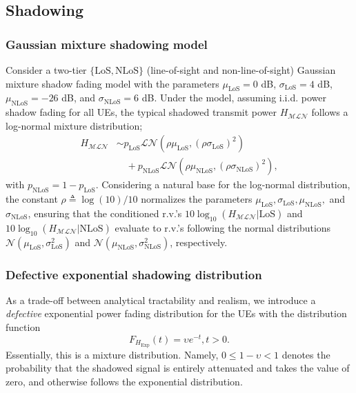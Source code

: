 \documentclass[lettersize,journal]{IEEEtran}
\begin{document}
\subsection{Shadowing}

\subsubsection{Gaussian mixture shadowing model}
\label{sec:guassianmixture}

Consider a two-tier $\{\text{LoS},\text{NLoS}\}$ (line-of-sight and non-line-of-sight) Gaussian mixture shadow fading model with the parameters $\mu_{\text{LoS}} = 0$ dB, $\sigma_{\text{LoS}} = 4$ dB, $\mu_{\text{NLoS}} = -26$ dB, and $\sigma_{\text{NLoS}} = 6$ dB. Under the model, assuming i.i.d. power shadow fading for all UEs, the typical shadowed transmit power $H_{\mathcal{M}\mathcal{L}\mathcal{N}}$ follows a log-normal mixture distribution;
\begin{align}
  \label{eq:tier2lognormal}
  H_{\mathcal{M}\mathcal{L}\mathcal{N}} &\sim p_{\text{LoS}} \mathcal{L}\mathcal{N}(\rho \mu_{\text{LoS}}, (\rho \sigma_{\text{LoS}})^2) \nonumber \\
  &\quad + p_{\text{NLoS}} \mathcal{L}\mathcal{N}(\rho \mu_{\text{NLoS}}, (\rho \sigma_{\text{NLoS}})^2),
\end{align}
with $p_{\text{NLoS}}= 1 - p_{\text{LoS}}$. Considering a natural base for the log-normal distribution, the constant $\rho \triangleq \log(10)/10$ normalizes the parameters $\mu_{\text{LoS}}, \sigma_{\text{LoS}}, \mu_{\text{NLoS}},$ and $\sigma_{\text{NLoS}}$, ensuring that the conditioned r.v.'s $10 \log_{10}(H_{\mathcal{MLN}}|\text{LoS})$ and $10 \log_{10}(H_{\mathcal{MLN}}|\text{NLoS})$ evaluate to r.v.'s following the normal distributions $\mathcal{N}(\mu_{\text{LoS}}, \sigma_{\text{LoS}}^2)$ and $\mathcal{N}(\mu_{\text{NLoS}}, \sigma_{\text{NLoS}}^2)$, respectively.



\subsubsection{Defective exponential shadowing distribution}
As a trade-off between analytical tractability and realism, we introduce a \textit{defective} exponential power fading distribution for the UEs with the distribution function
\begin{equation}
  \label{eq:defexp}
  F_{{H}_{\text{Exp}}}(t) = \upsilon e^{-t}, t>0.
\end{equation}
Essentially, this is a mixture distribution. Namely, $0 \leq 1-\upsilon < 1$ denotes the probability that the shadowed signal is entirely attenuated and takes the value of zero, and otherwise follows the exponential distribution. 
\end{document}
